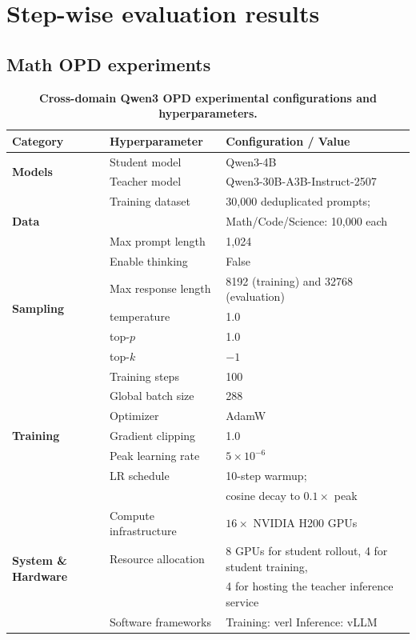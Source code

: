 \section{Step-wise evaluation results}

\subsection{Math OPD experiments}
\label{app:math-learning-trajectories}

\begin{table}[t]
\caption{\textbf{Cross-domain Qwen3 OPD experimental configurations and hyperparameters.}}
\label{tab:qwen3-opd-hyperparameters}
\centering
\small
\renewcommand{\arraystretch}{1.18}
\setlength{\tabcolsep}{6pt}
\begin{tabular}{@{}lll@{}}
\toprule
\textbf{Category} & \textbf{Hyperparameter} & \textbf{Configuration / Value} \\
\midrule
\multirow{2}{*}{\textbf{Models}}
& Student model & Qwen3-4B \\
& Teacher model & Qwen3-30B-A3B-Instruct-2507 \\
\midrule
\multirow{3}{*}{\textbf{Data}}
& Training dataset & 30,000 deduplicated prompts; \\
& & Math/Code/Science: 10,000 each \\
& Max prompt length & 1,024 \\
\midrule
\multirow{5}{*}{\textbf{Sampling}}
& Enable thinking & False \\
& Max response length & 8192 (training) and 32768 (evaluation) \\
& temperature & 1.0 \\
& top-$p$ & 1.0 \\
& top-$k$ & $-1$ \\
\midrule
\multirow{7}{*}{\textbf{Training}}
& Training steps & 100 \\
& Global batch size & 288 \\
& Optimizer & AdamW \\
& Gradient clipping & 1.0 \\
& Peak learning rate & $5\times10^{-6}$ \\
& LR schedule & 10-step warmup; \\
& & cosine decay to $0.1\times$ peak \\
\midrule
\multirow{4}{*}{\textbf{System \& Hardware}}
& Compute infrastructure & $16\times$ NVIDIA H200 GPUs \\
& Resource allocation & 8 GPUs for student rollout, 4 for student training, \\
& & 4 for hosting the teacher inference service \\
& Software frameworks & Training: verl \quad Inference: vLLM \\
\bottomrule
\end{tabular}
\end{table}


